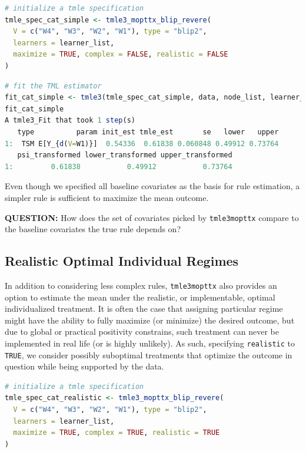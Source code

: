 \documentclass[
  12pt, krantz2,
]{krantz}
\newcommand{\passthrough}[1]{#1}
\newcommand{\1}{\mathbbm{1}}
\theoremstyle{definition}
\theoremstyle{definition}
\theoremstyle{definition}
\theoremstyle{definition}
\theoremstyle{remark}
\begin{document}
\begin{lstlisting}[language=R]
# initialize a tmle specification
tmle_spec_cat_simple <- tmle3_mopttx_blip_revere(
  V = c("W4", "W3", "W2", "W1"), type = "blip2",
  learners = learner_list,
  maximize = TRUE, complex = FALSE, realistic = FALSE
)
\end{lstlisting}

\begin{lstlisting}[language=R]
# fit the TML estimator
fit_cat_simple <- tmle3(tmle_spec_cat_simple, data, node_list, learner_list)
fit_cat_simple
A tmle3_Fit that took 1 step(s)
   type          param init_est tmle_est       se   lower   upper
1:  TSM E[Y_{d(V=W1)}]  0.54336  0.61838 0.060848 0.49912 0.73764
   psi_transformed lower_transformed upper_transformed
1:         0.61838           0.49912           0.73764
\end{lstlisting}

Even though we specified all baseline covariates as the basis
for rule estimation, a simpler rule is sufficient to maximize the mean outcome.

\textbf{QUESTION:} How does the set of covariates picked by \passthrough{\lstinline!tmle3mopttx!}
compare to the baseline covariates the true rule depends on?

\hypertarget{oit-eval-cat-v3}{%
\subsection{Realistic Optimal Individual Regimes}\label{oit-eval-cat-v3}}

In addition to considering less complex rules, \passthrough{\lstinline!tmle3mopttx!} also provides an
option to estimate the mean under the realistic, or implementable, optimal
individualized treatment. It is often the case that assigning particular regime
might have the ability to fully maximize (or minimize) the desired outcome, but
due to global or practical positivity constrains, such treatment can never be
implemented in real life (or is highly unlikely). As such, specifying
\passthrough{\lstinline!realistic!} to \passthrough{\lstinline!TRUE!}, we consider possibly suboptimal treatments that optimize
the outcome in question while being supported by the data.

\begin{lstlisting}[language=R]
# initialize a tmle specification
tmle_spec_cat_realistic <- tmle3_mopttx_blip_revere(
  V = c("W4", "W3", "W2", "W1"), type = "blip2",
  learners = learner_list,
  maximize = TRUE, complex = TRUE, realistic = TRUE
)
\end{lstlisting}
\end{document}

